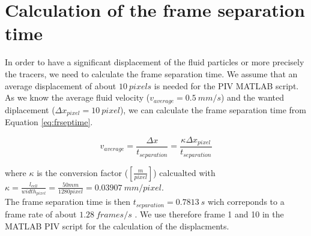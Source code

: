 \section{Calculation of the frame separation time}

In order to have a significant displacement of the fluid particles or more precisely the tracers, we need to calculate the frame separation time. We assume that an average displacement of about $10\ pixels$ is needed for the PIV MATLAB script. As we know the average fluid velocity ($ v_{average} = 0.5\ mm/s$) and the wanted diplacement ($\Delta x_{pixel}=10\ pixel$), we can calculate the frame separation time from Equation \ref{eq:frseptime}.

\begin{equation}
v_{average}=\frac{\Delta x}{t_{separation}}=\frac{\kappa \Delta x_{pixel}}{t_{separation}}
\label{eq:frseptime}
\end{equation}

where $\kappa$ is the conversion factor ($[\frac{m}{pixel}]$) calcualted with $\kappa=\frac{l_{cell}}{width_{pixel}} = \frac{50 mm}{1280 pixel}=0.03907\ mm/pixel$.\\

The frame separation time is then $t_{separation}=0.7813\ s$ wich correponds to a frame rate of about $1.28\ frames/s$ . We use therefore frame 1 and 10 in the MATLAB PIV script for the calculation of the displacments.